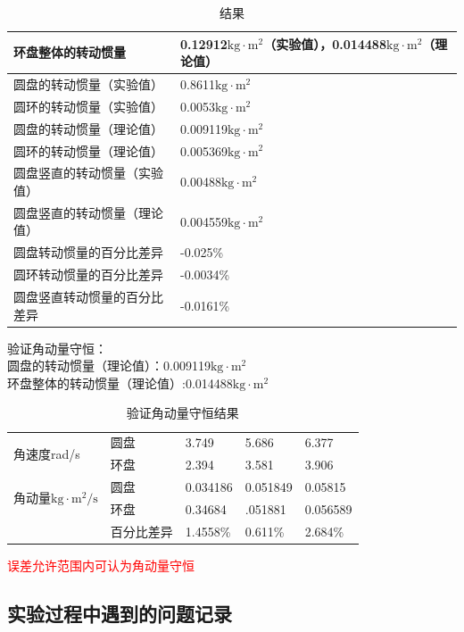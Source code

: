 \documentclass[dvipsnames, svgnames,a4paper,11pt]{article}
\begin{document}
\begin{table}[H]
	\renewcommand\arraystretch{1.7}
	\centering
    \caption{结果}
	\begin{tabularx}{\textwidth}{|l|X|}
	\hline
	环盘整体的转动惯量&0.12912$\text{kg}\cdot\text{m}^2$（实验值），0.014488$\text{kg}\cdot\text{m}^2$（理论值）\\
	\hline
	圆盘的转动惯量（实验值）&0.8611$\text{kg}\cdot\text{m}^2$\\
	\hline
	圆环的转动惯量（实验值）&0.0053$\text{kg}\cdot\text{m}^2$\\
	\hline
	圆盘的转动惯量（理论值）&0.009119$\text{kg}\cdot\text{m}^2$\\
	\hline
	圆环的转动惯量（理论值）&0.005369$\text{kg}\cdot\text{m}^2$\\
	\hline
	圆盘竖直的转动惯量（实验值）&0.00488$\text{kg}\cdot\text{m}^2$\\
	\hline
	圆盘竖直的转动惯量（理论值）&0.004559$\text{kg}\cdot\text{m}^2$\\
	\hline
	圆盘转动惯量的百分比差异&-0.025\%\\
	\hline
	圆环转动惯量的百分比差异&-0.0034\%\\
	\hline
	圆盘竖直转动惯量的百分比差异&-0.0161\%\\
	\hline
	\end{tabularx}
\end{table}
验证角动量守恒：\\
圆盘的转动惯量（理论值）：0.009119$\text{kg}\cdot\text{m}^2$\\
环盘整体的转动惯量（理论值）:0.014488$\text{kg}\cdot\text{m}^2$\\
\begin{table}[H]
	\renewcommand\arraystretch{1.7}
	\centering
    \caption{验证角动量守恒结果}
	\begin{tabularx}{\textwidth}{|X|X|X|X|X|}
	\hline
	\multirow{2}{*}{角速度rad/s}&圆盘&3.749&5.686&6.377\\
	\cline{2-5}
	&环盘&2.394&3.581&3.906\\
	\hline
	\multirow{2}{*}{角动量$\text{kg}\cdot\text{m}^2\text{/s}$}&圆盘&0.034186&0.051849&0.05815\\
	\cline{2-5}
	&环盘&0.34684&.051881&0.056589\\
	\hline
	&百分比差异&1.4558\%&0.611\%&2.684\%\\
	\hline
	\end{tabularx}
\end{table}
\textcolor{red}{误差允许范围内可认为角动量守恒}
\subsection{实验过程中遇到的问题记录}
\end{document}
